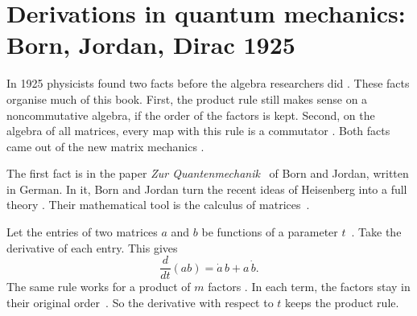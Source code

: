 \section[Derivations in quantum mechanics: Born, Jordan, Dirac 1925][Quantum mechanics]{Derivations in quantum mechanics: Born, Jordan, Dirac 1925}\label{sec:origins:physics}

In 1925 physicists found two facts before the algebra researchers did
\cite[p.~858]{BornJordan1925}. These facts organise much of this book. First,
the product rule still makes sense on a noncommutative algebra, if the order of
the factors is kept.
Second, on the algebra of all matrices, every map with this rule is a
commutator \cite[p.~858]{BornJordan1925}. Both facts came out of the new
matrix mechanics \cite[p.~858]{BornJordan1925}.

The first fact is in the paper \emph{Zur
Quantenmechanik}~\cite{BornJordan1925} of Born and Jordan, written in German.
In it, Born and Jordan turn the recent ideas of Heisenberg into a full theory
\cite[p.~858]{BornJordan1925}. Their mathematical tool is the calculus of
matrices~\cite[p.~858]{BornJordan1925}.

Let the entries of two matrices $a$ and $b$ be functions of a parameter $t$~\cite[(11), (11$'$), p.~861]{BornJordan1925}.
Take the derivative of each entry. This gives
\[
  \frac{d}{dt}(ab) = \dot a\, b + a\, \dot b .
\]
The same rule works for a product of $m$ factors \cite[(11), (11$'$), p.~861]{BornJordan1925}. In each term, the factors
stay in their original order~\cite[(11), (11$'$), p.~861]{BornJordan1925}.
So the derivative with respect to $t$ keeps the product rule.

